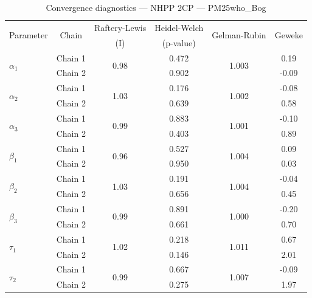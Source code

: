 \begin{table}[H]
\centering
\caption{Convergence diagnostics — NHPP 2CP — PM25who_Bog}
\begin{tabular}{lccccc}
\toprule
\multirow{2}{*}{Parameter} & \multirow{2}{*}{Chain} & Raftery-Lewis & Heidel-Welch & \multirow{2}{*}{Gelman-Rubin} & \multirow{2}{*}{Geweke} \\
 & & (I) & (p-value) & & (z) \\
\midrule
\multirow{2}{*}{$\alpha_1$} & Chain 1 & \multirow{2}{*}{0.98} & 0.472 & \multirow{2}{*}{1.003} & 0.19 \\
 & Chain 2 & & 0.902 & & -0.09 \\
\multirow{2}{*}{$\alpha_2$} & Chain 1 & \multirow{2}{*}{1.03} & 0.176 & \multirow{2}{*}{1.002} & -0.08 \\
 & Chain 2 & & 0.639 & & 0.58 \\
\multirow{2}{*}{$\alpha_3$} & Chain 1 & \multirow{2}{*}{0.99} & 0.883 & \multirow{2}{*}{1.001} & -0.10 \\
 & Chain 2 & & 0.403 & & 0.89 \\
\midrule
\multirow{2}{*}{$\beta_1$} & Chain 1 & \multirow{2}{*}{0.96} & 0.527 & \multirow{2}{*}{1.004} & 0.09 \\
 & Chain 2 & & 0.950 & & 0.03 \\
\multirow{2}{*}{$\beta_2$} & Chain 1 & \multirow{2}{*}{1.03} & 0.191 & \multirow{2}{*}{1.004} & -0.04 \\
 & Chain 2 & & 0.656 & & 0.45 \\
\multirow{2}{*}{$\beta_3$} & Chain 1 & \multirow{2}{*}{0.99} & 0.891 & \multirow{2}{*}{1.000} & -0.20 \\
 & Chain 2 & & 0.661 & & 0.70 \\
\midrule
\multirow{2}{*}{$\tau_1$} & Chain 1 & \multirow{2}{*}{1.02} & 0.218 & \multirow{2}{*}{1.011} & 0.67 \\
 & Chain 2 & & 0.146 & & 2.01 \\
\multirow{2}{*}{$\tau_2$} & Chain 1 & \multirow{2}{*}{0.99} & 0.667 & \multirow{2}{*}{1.007} & -0.09 \\
 & Chain 2 & & 0.275 & & 1.97 \\
\bottomrule
\end{tabular}
\end{table}
